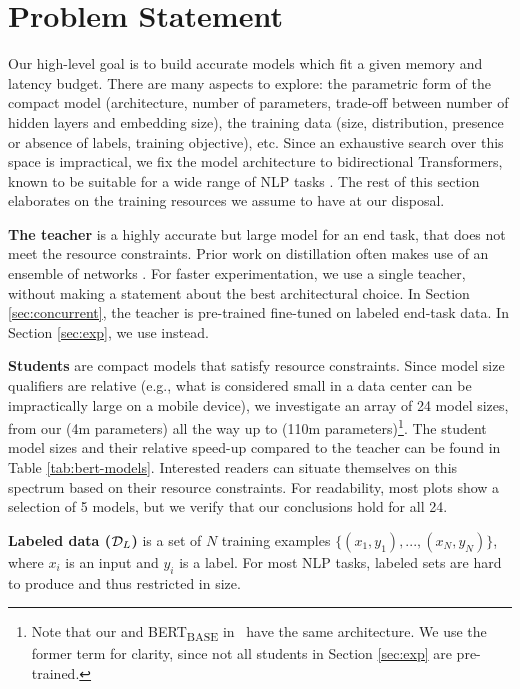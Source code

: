 \section{Problem Statement}
\label{sec:prelim}

Our high-level goal is to build accurate models which fit a given memory and latency budget. There are many aspects to explore: the parametric form of the compact model (architecture, number of parameters, trade-off between number of hidden layers and embedding size), the training data (size, distribution, presence or absence of labels, training objective), etc. Since an exhaustive search over this space is impractical, we fix the model architecture to bidirectional Transformers, known to be suitable for a wide range of NLP tasks \citep{transformer,bert}. The rest of this section elaborates on the training resources we assume to have at our disposal.

\textbf{The teacher} is a highly accurate but large model for an end task, that does not meet the resource constraints. Prior work on distillation often makes use of an ensemble of networks \citep{distillation}. For faster experimentation, we use a single teacher, without making a statement about the best architectural choice. In Section \ref{sec:concurrent}, the teacher is pre-trained \bb fine-tuned on labeled end-task data. In Section \ref{sec:exp}, we use \bertlarge instead. 

\textbf{Students} are compact models that satisfy resource constraints. Since model size qualifiers are relative (e.g., what is considered small in a data center can be impractically large on a mobile device), we investigate an array of 24 model sizes, from our \berttiny (4m parameters) all the way up to \bertbase (110m parameters)\footnote{Note that our \bertbase and BERT\textsubscript{BASE} in~\citet{bert} have the same architecture. We use the former term for clarity, since not all students in Section \ref{sec:exp} are pre-trained.}. The student model sizes and their relative speed-up compared to the \bertlarge teacher can be found in Table \ref{tab:bert-models}. Interested readers can situate themselves on this spectrum based on their resource constraints. For readability, most plots show a selection of 5 models, but we verify that our conclusions hold for all 24.

\textbf{Labeled data ($\mathcal{D}_{L}$)} is a set of $N$ training examples $\{(x_1, y_1), ..., (x_N, y_N)\}$, where $x_i$ is an input and $y_i$ is a label. For most NLP tasks, labeled sets are hard to produce and thus restricted in size.

